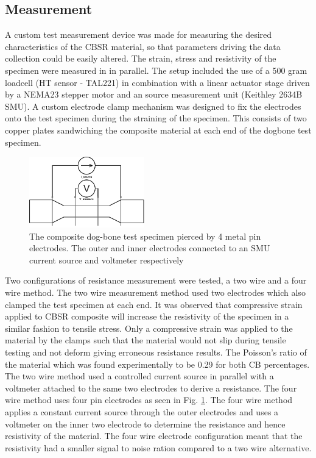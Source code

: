 \subsection{Measurement}
A custom test measurement device was made for measuring the desired characteristics of the CBSR material, so that parameters driving the data collection could be easily altered. The strain, stress and resistivity of the specimen were measured in in parallel. The setup included the use of a 500 gram loadcell (HT sensor - TAL221) in combination with a linear actuator stage driven by a NEMA23 stepper motor and an source measurement unit (Keithley 2634B SMU). A custom electrode clamp mechanism was designed to fix the electrodes onto the test specimen during the straining of the specimen. This consists of two copper plates sandwiching the composite material at each end of the dogbone test specimen.
\begin{figure}[H]
	\centering
	\includegraphics[width=5cm]{Figures/4wire_specimen.png}
	\caption{The composite dog-bone test specimen pierced by 4 metal pin electrodes. The outer and inner electrodes connected to an SMU current source and voltmeter respectively}
	\label{fig:four_wire_dogbone}
\end{figure}
Two configurations of resistance measurement were tested, a two wire and a four wire method. The two wire measurement method used two electrodes which also clamped the test specimen at each end. It was observed that compressive strain applied to CBSR composite will increase the resistivity of the specimen in a similar fashion to tensile stress. Only a compressive strain was applied to the material by the clamps such that the material would not slip during tensile testing and not deform giving erroneous resistance results. The Poisson's ratio of the material which was found experimentally to be 0.29 for both CB percentages. The two wire method used a controlled current source in parallel with a voltmeter attached to the same two electrodes to derive a resistance. The four wire method uses four pin electrodes as seen in Fig. \ref{fig:four_wire_dogbone}. The four wire method applies a constant current source through the outer electrodes and uses a voltmeter on the inner two electrode to determine the resistance and hence resistivity of the material. The four wire electrode configuration meant that the resistivity had a smaller signal to noise ration compared to a two wire alternative. 

